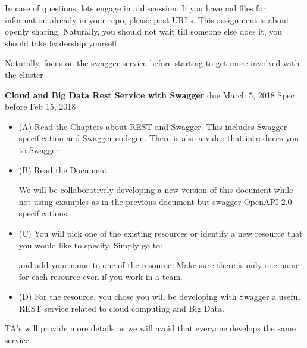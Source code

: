 \begin{exercise}
\begin{itemize}
\begin{itemize}
  \end{itemize}
 \end{itemize}
 
In case of questions, lets engage in a discussion. If you have md
files for information already in your repo, please post URLs. This
assignment is about openly sharing. Naturally, you should not wait
till someone else does it, you should take leadership yourself.

 
Naturally, focus on the swagger service before starting to get more
involved with the cluster

\end{exercise}

\begin{exercise} {\bf Cloud and Big Data Rest Service with Swagger}
  due March 5, 2018 Spec before Feb 15, 2018

\begin{itemize}
     
\item (A) Read the Chapters about REST and Swagger. This includes
  Swagger specification and Swagger codegen. There is also a video
  that introduces you to Swagger 
 
\item (B) Read the Document
 
  We will be collaboratively developing a new version of this document
  while not using examples as in the previous document but swagger
  OpenAPI 2.0 specifications.
 
\item (C) You will pick one of the existing resources or identify a
  new resource that you would like to specify. Simply go to:


and add your name to one of the resource. Make sure there is only one
name for each resource even if you work in a team.
 
\item (D) For the resource, you chose you will be developing with
  Swagger a useful REST service related to cloud computing and Big
  Data.

 
 \end{itemize}

 TA's will provide more details as we will avoid that everyone
 develops the same service.
 

\end{exercise}
